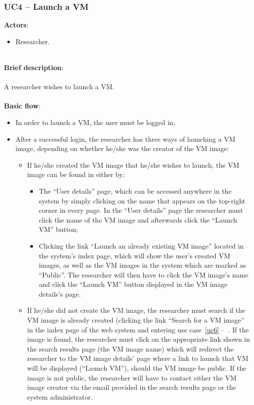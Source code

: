\subsubsection{UC4 -- Launch a VM}\label{uc4}

\textbf{Actors}:

\begin{itemize}
\item Researcher.
\end{itemize}

\ \\
\textbf{Brief description}:\\
\ \\
A researcher wishes to launch a VM.\\
\ \\
\textbf{Basic flow}:

\begin{itemize}
\item In order to launch a VM, the user must be logged in;
\item After a successful login, the researcher has three ways of launching a VM image, depending on whether he/she was the creator of the VM image:
	\begin{itemize}
	\item If he/she created the VM image that he/she wishes to launch, the VM image can be found in either by:
		\begin{itemize} 
		\item The ``User details'' page, which can be accessed anywhere in the system by simply clicking on the name that appears on the top-right corner in every page. In the ``User details'' page the researcher must click the name of the VM image and afterwards click the ``Launch VM'' button;
		\item Clicking the link ``Launch an already existing VM image'' located in the system's index page, which will show the user's created VM images, as well as the VM images in the system which are marked as ``Public''. The researcher will then have to click the VM image's name and click the ``Launch VM'' button displayed in the VM image details's page.
		\end{itemize}
	\item If he/she did not create the VM image, the researcher must search if the VM image is already created (clicking the link ``Search for a VM image'' in the index page of the web system and entering use case~\ref{uc6} --~. If the image is found, the researcher must click on the appropriate link shown in the search results page (the VM image name) which will redirect the researcher to the VM image details' page where a link to launch that VM will be displayed (``Launch VM''), should the VM image be public. If the image is not public, the researcher will have to contact either the VM image creator via the email provided in the search results page or the system administrator.

\end{itemize}
\end{itemize}
